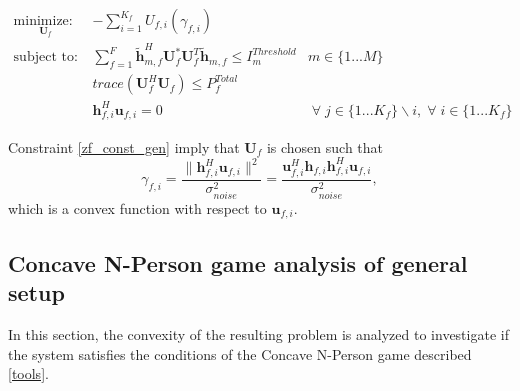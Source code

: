 \documentclass[12pt,a4paper]{report}
\begin{document}
	\begin{subequations}
	\label{optim}
	\begin{align}
	    \underset{\mathbf{U}_{f} }{\text{minimize: }} \;
	    & - \sum_{i=1}^{K_f}
    	U_{f,i}(\gamma_{f,i}) \label{player_opt} \\
	    \text{subject to: } \; &
	   \sum^F_{f=1} \mathbf{\tilde{h}}_{m,f}^H  \mathbf{U}_{f}^*		
	\mathbf{U}_{f}^{T} \mathbf{\tilde{h}}_{m,f} \leq I^{Threshold}		
	_{m} & m \in \{1 ...M\} 
		\label{interference_const_gen}\\
        & trace(\mathbf{U}_{f}^H\mathbf{U}_{f}) \leq P^{Total}_{f} \label{power_const_gen}\\
        & \mathbf{h}_{f,i}^H\mathbf{u}_{f,i} =0\ & \; \forall \; j \in \{1... K_{f}\}\backslash i,\; \forall \; i\in \{1 ... K_{f}\} \label{zf_const_gen}
	\end{align}
	\end{subequations}


Constraint \eqref{zf_const_gen} imply that $\mathbf{U}_{f}$ is chosen such that  
	\begin{equation}\label{zf_snr}
	\gamma_{f,i} = \frac{\|\mathbf{h}^H_{f,i}\mathbf{u}_{f,i}\|^2}
	{\sigma^2_{noise}  
	}
	= 
	\frac{\mathbf{u}^H_{f,i}\mathbf{h}_{f,i}\mathbf{h}^H_{f,i}\mathbf{u}_{f,i}}
	{\sigma^2_{noise}  
	},
	\end{equation}
	which is a convex function with respect to $\mathbf{u}_{f,i}$.
	
\subsection{Concave N-Person game analysis of general setup}
In this section, the convexity of the resulting problem is analyzed to investigate if the system satisfies the conditions of the Concave N-Person game described \ref{tools}. 
\end{document}
